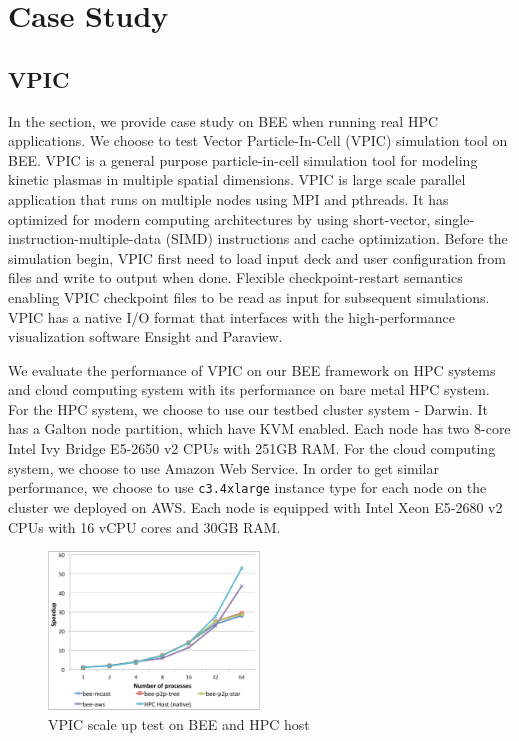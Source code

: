 \section{Case Study}
  \label{sec:case_study}
  \subsection{VPIC}
  In the section, we provide case study on BEE when running real HPC applications. We choose to test Vector Particle-In-Cell (VPIC) simulation tool \cite{bowers20080, bowers2008ultrahigh, bowers2009advances} on BEE. VPIC is a general purpose particle-in-cell simulation tool for modeling kinetic plasmas in multiple spatial dimensions. VPIC is large scale parallel application that runs on multiple nodes using MPI and pthreads. It has optimized for modern computing architectures by using short-vector, single-instruction-multiple-data (SIMD) instructions and cache optimization. Before the simulation begin, VPIC first need to load input deck and user configuration from files and write to output when done. Flexible checkpoint-restart semantics enabling VPIC checkpoint files to be read as input for subsequent simulations. VPIC has a native I/O format that interfaces with the high-performance visualization software Ensight and Paraview. 

We evaluate the performance of VPIC on our BEE framework on HPC systems and cloud computing system with  its performance on bare metal HPC system. For the HPC system, we choose to use our testbed cluster system - Darwin. It has a Galton node partition, which have KVM enabled. Each node has two 8-core Intel Ivy Bridge E5-2650 v2 CPUs with 251GB RAM. For the cloud computing system, we choose to use Amazon Web Service. In order to get similar performance, we choose to use \texttt{c3.4xlarge} instance type for each node on the cluster we deployed on AWS. Each node is equipped with Intel Xeon E5-2680 v2 CPUs with 16 vCPU cores and 30GB RAM. 


\begin{figure}[h]
    \centering
    \caption{VPIC scale up test on BEE and HPC host}
    \label{vpic-test}
    \includegraphics[width=0.5\textwidth]{figures/vpic-test.pdf}
\end{figure}

